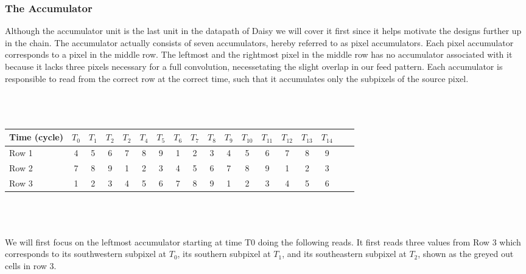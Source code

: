 \subsubsection{The Accumulator}
Although the accumulator unit is the last unit in the datapath of Daisy we will cover it first since it helps motivate the designs further up in the chain.
The accumulator actually consists of seven accumulators, hereby referred to as pixel accumulators. Each pixel accumulator corresponds to a pixel in the middle row.
The leftmost and the rightmost pixel in the middle row has no accumulator associated with it because it lacks three pixels necessary for a full convolution, necessetating the slight overlap in our feed pattern.
Each accumulator is responsible to read from the correct row at the correct time, such that it accumulates only the subpixels of the source pixel.\\ \\ \\
\\
\begin{tabular}{l*{16}{c}r}
    Time (cycle)        & $T_{0}$ & $T_{1}$ & $T_{2}$ & $T_{2}$ & $T_{4}$  & $T_{5}$ & $T_{6}$ & $T_{7}$ & $T_{8}$ & $T_{9}$ & $T_{10}$ & $T_{11}$ & $T_{12}$ & $T_{13}$ & $T_{14}$\\
\hline
Row 1                   & 4 & 5 & 6 & 7 & 8 & 9 & \cellcolor{gray75} 1 & \cellcolor{gray75} 2 & \cellcolor{gray75} 3 & 4 & 5 & 6 & 7 & 8 & 9 & \\
Row 2                   & 7 & 8 & 9 & \cellcolor{gray75} 1 & \cellcolor{gray75} 2 & \cellcolor{gray75} 3 & 4 & 5 & 6 & 7 & 8 & 9 & \cellcolor{gray75} 1 & \cellcolor{gray75} 2 & \cellcolor{gray75} 3 & \\
Row 3                   & \cellcolor{gray75} 1 & \cellcolor{gray75} 2 & \cellcolor{gray75} 3 & 4 & 5 & 6 & 7 & 8 & 9 & \cellcolor{gray75} 1 & \cellcolor{gray75} 2 & \cellcolor{gray75} 3 & 4 & 5 & 6 & \\
\end{tabular}\\ \\ \\
We will first focus on the leftmost accumulator starting at time T0 doing the following reads. 
It first reads three values from Row 3 which corresponds to its southwestern subpixel at $T_{0}$, its southern subpixel at $T_{1}$, and its southeastern subpixel at $T_{2}$, shown as the greyed out cells in row 3.
